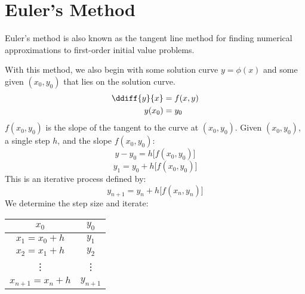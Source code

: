 \documentclass{math}
\begin{document}
\section*{Euler's Method}
Euler's method is also known as the tangent line method for finding numerical
approximations to first-order initial value problems.
\begin{center}
\end{center}
With this method, we also begin with some solution curve \( y = \phi(x) \) and
some given \( (x_0,y_0) \) that lies on the solution curve.
\begin{align*}
  \ddiff{y}{x} &= f(x,y) \\
  y(x_0) &= y_0
\end{align*}
\( f(x_0,y_0) \) is the slope of the tangent to the curve at \( (x_0,y_0) \).
Given \( (x_0,y_0) \), a single step \( h \), and the slope \( f(x_0,y_0) \):
\[ y-y_0 = h\big[f(x_0,y_0)\big] \]
\[ y_1 = y_0+h\big[f(x_0,y_0)\big] \]
This is an iterative process defined by:
\[ y_{n+1} = y_n+h\big[f(x_n,y_n)\big] \]
We determine the step size and iterate:
\begin{center}
  \begin{tabular}{|c|c|}
    \hline
    \( x_0 \) & \( y_0 \) \\
    \hline
    \( x_1 = x_0+h \) & \( y_1 \) \\
    \hline
    \( x_2 = x_1+h \) & \( y_2 \) \\
    \hline
    \vdots & \vdots \\
    \hline
    \( x_{n+1} = x_n+h \) & \( y_{n+1} \) \\
    \hline
  \end{tabular}
\end{center}
\end{document}
